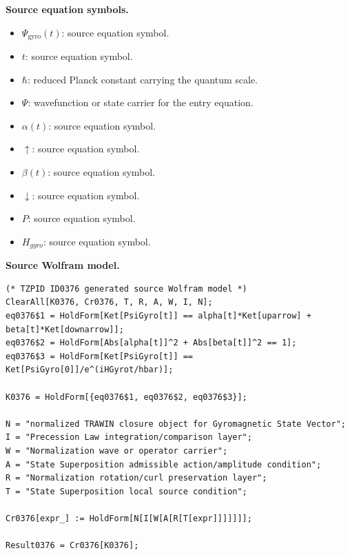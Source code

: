\begin{minipage}[t]{0.49\linewidth}
\begingroup
\small
\raggedright
\textbf{Source equation symbols.}\par
\begin{itemize}[leftmargin=1.35em,itemsep=1pt,topsep=1pt,parsep=0pt]
    \item $\Psi_{\mathrm{gyro}}(t)$: source equation symbol.
    \item $t$: source equation symbol.
    \item $\hbar$: reduced Planck constant carrying the quantum scale.
    \item $\Psi$: wavefunction or state carrier for the entry equation.
    \item $\alpha(t)$: source equation symbol.
    \item $\uparrow$: source equation symbol.
    \item $\beta(t)$: source equation symbol.
    \item $\downarrow$: source equation symbol.
    \item $P$: source equation symbol.
    \item $H_{gyro}$: source equation symbol.
\end{itemize}
\endgroup
\end{minipage}\hfill
\begin{minipage}[t]{0.47\linewidth}
\begingroup
\scriptsize
\raggedright
\textbf{Source Wolfram model.}\par
\begin{Verbatim}[fontsize=\tiny,breaklines=true,breakanywhere=true]
(* TZPID ID0376 generated source Wolfram model *)
ClearAll[K0376, Cr0376, T, R, A, W, I, N];
eq0376$1 = HoldForm[Ket[PsiGyro[t]] == alpha[t]*Ket[uparrow] + beta[t]*Ket[downarrow]];
eq0376$2 = HoldForm[Abs[alpha[t]]^2 + Abs[beta[t]]^2 == 1];
eq0376$3 = HoldForm[Ket[PsiGyro[t]] == Ket[PsiGyro[0]]/e^(iHGyrot/hbar)];

K0376 = HoldForm[{eq0376$1, eq0376$2, eq0376$3}];

N = "normalized TRAWIN closure object for Gyromagnetic State Vector";
I = "Precession Law integration/comparison layer";
W = "Normalization wave or operator carrier";
A = "State Superposition admissible action/amplitude condition";
R = "Normalization rotation/curl preservation layer";
T = "State Superposition local source condition";

Cr0376[expr_] := HoldForm[N[I[W[A[R[T[expr]]]]]]];

Result0376 = Cr0376[K0376];
\end{Verbatim}
\endgroup
\end{minipage}

